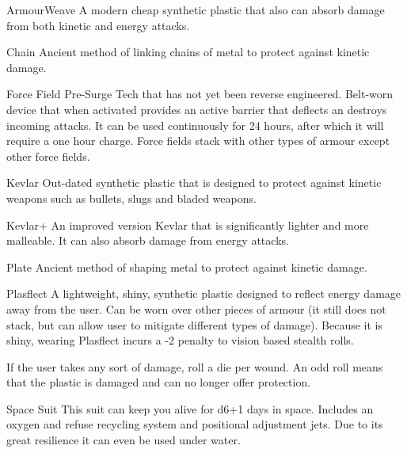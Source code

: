 \begin{multicols}{2}

\begin{genericsection}{ArmourWeave\texttrademark}
A modern cheap synthetic plastic that also can absorb damage from both kinetic and energy attacks.
\end{genericsection}

\begin{genericsection}{Chain}
Ancient method of linking chains of metal to protect against kinetic damage.
\end{genericsection}

\begin{genericsection}{Force Field}
Pre-Surge Tech that has not yet been reverse engineered. Belt-worn device that when activated provides an active barrier that deflects an destroys incoming attacks. It can be used continuously for 24 hours, after which it will require a one hour charge. Force fields stack with other types of armour except other force fields.
\end{genericsection}

\begin{genericsection}{Kevlar}
Out-dated synthetic plastic that is designed to protect against kinetic weapons such as bullets, slugs and bladed weapons.
\end{genericsection}

\begin{genericsection}{Kevlar+\texttrademark}
An improved version Kevlar that is significantly lighter and more malleable. It can also absorb damage from energy attacks.
\end{genericsection}

\begin{genericsection}{Plate}
Ancient method of shaping metal to protect against kinetic damage.
\end{genericsection}

\begin{genericsection}{Plasflect\texttrademark }
A lightweight, shiny, synthetic plastic designed to reflect energy damage away from the user. Can be worn over other pieces of armour (it still does not stack, but can allow user to mitigate different types of damage). Because it is shiny, wearing Plasflect incurs a -2 penalty to vision based stealth rolls.

If the user takes any sort of damage, roll a die per wound. An odd roll means that the plastic is damaged and can no longer offer protection.
\end{genericsection}

\begin{genericsection}{Space Suit}
This suit can keep you alive for d6+1 days in space. Includes an oxygen and refuse recycling system and positional adjustment jets. Due to its great resilience it can even be used under water.
\end{genericsection}

\end{multicols}

